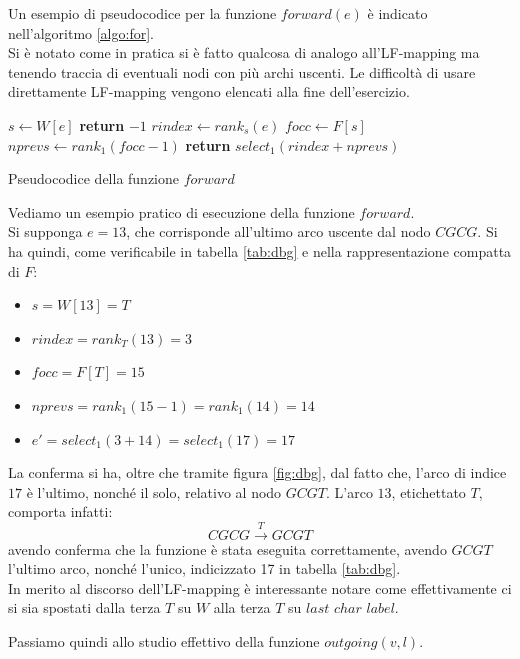 \documentclass[a4paper,12pt, oneside]{book}
\begin{document}
\noindent
Un esempio di pseudocodice per la funzione $forward(e)$ è indicato
nell'algoritmo \ref{algo:for}.\\ 
Si è notato come in pratica si è fatto qualcosa di analogo all'LF-mapping ma
tenendo traccia di eventuali nodi con più archi uscenti. Le difficoltà di usare
direttamente LF-mapping vengono elencati alla fine dell'esercizio.
\begin{algorithm}
  \large
  \begin{algorithmic}
    \State $s\gets W[e]$
    \State \textbf{return} $-1$
    \EndIf
    \State $rindex \gets rank_s(e)$
    \State $focc \gets F[s]$
    \State $nprevs\gets rank_1(focc-1)$
    \State \textbf{return} $select_1(rindex+nprevs)$ 
    \EndFunction
  \end{algorithmic}
  \caption{Pseudocodice della funzione $forward$}
  \label{algo:for}
\end{algorithm}
\newpage
\begin{esempio}
  Vediamo un esempio pratico di esecuzione della funzione $forward$.\\
  Si supponga $e=13$, che corrisponde all'ultimo arco uscente dal nodo
  $CGCG$. Si ha quindi, come verificabile in tabella \ref{tab:dbg} e 
  nella rappresentazione compatta di $F$:
  \begin{itemize}
    \item $s=W[13]=T$
    \item $rindex = rank_T(13)=3$
    \item $focc = F[T]=15$
    \item $nprevs = rank_1(15-1) = rank_1(14) = 14$
    \item $e'=select_1(3+14) = select_1(17) = 17$
  \end{itemize}
  La conferma si ha, oltre che tramite figura \ref{fig:dbg}, dal fatto che,
  l'arco di indice $17$ è l'ultimo, nonché il 
  solo, relativo al nodo $GCGT$. L'arco $13$, etichettato $T$, comporta infatti:
  \[CGCG\stackrel{T}{\to}GCGT\]
  avendo conferma che la funzione è stata eseguita correttamente, avendo $GCGT$
  l'ultimo arco, nonché l'unico, indicizzato 17 in tabella \ref{tab:dbg}.\\
  In merito al discorso dell'LF-mapping è interessante notare come
  effettivamente ci si sia spostati dalla terza $T$ su $W$ alla terza $T$ su
  $last$ $char$ $label$.  
  \label{es:for}
\end{esempio}
\newpage
\noindent
Passiamo quindi allo studio effettivo della funzione $outgoing(v,l)$.\\
\end{document}
